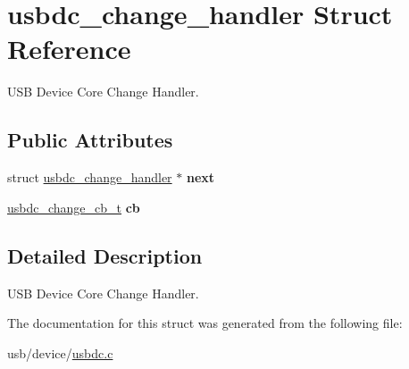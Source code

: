 \hypertarget{structusbdc__change__handler}{}\section{usbdc\+\_\+change\+\_\+handler Struct Reference}
\label{structusbdc__change__handler}


U\+SB Device Core Change Handler.  


\subsection*{Public Attributes}
\begin{DoxyCompactItemize}
\item 
\mbox{\label{structusbdc__change__handler_a82bcc97329222696a5fc579b81c48060}} 
struct \hyperlink{structusbdc__change__handler}{usbdc\+\_\+change\+\_\+handler} $\ast$ {\bfseries next}
\item 
\mbox{\label{structusbdc__change__handler_afa43412941c1ec6f30211288e680e532}} 
\hyperlink{usbdc_8h_a8d6bf559acb04a287476810e224ac782}{usbdc\+\_\+change\+\_\+cb\+\_\+t} {\bfseries cb}
\end{DoxyCompactItemize}


\subsection{Detailed Description}
U\+SB Device Core Change Handler. 

The documentation for this struct was generated from the following file\+:\begin{DoxyCompactItemize}
\item 
usb/device/\hyperlink{usbdc_8c}{usbdc.\+c}\end{DoxyCompactItemize}
